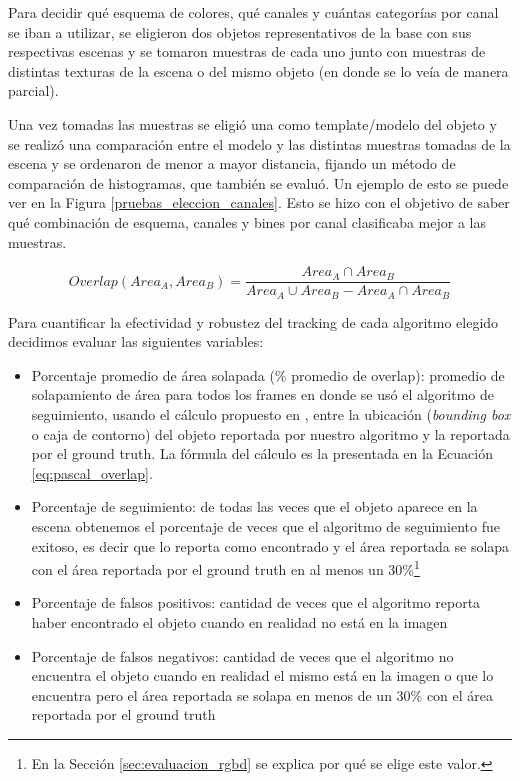 Para decidir qué esquema de colores, qué canales y cuántas categorías por canal se iban a utilizar, se eligieron dos objetos representativos de la base con sus respectivas escenas y se tomaron muestras de cada uno junto con muestras de distintas texturas de la escena o del mismo objeto (en donde se lo veía de manera parcial).

Una vez tomadas las muestras se eligió una como template/modelo del objeto y se realizó una comparación entre el modelo y las distintas muestras tomadas de la escena y se ordenaron de menor a mayor distancia, fijando un método de comparación de histogramas, que también se evaluó. Un ejemplo de esto se puede ver en la Figura \ref{pruebas_eleccion_canales}. Esto se hizo con el objetivo de saber qué combinación de esquema, canales y bines por canal clasificaba mejor a las muestras.

\begin{equation}\label{eq:pascal_overlap}
Overlap(Area_A, Area_B) = \frac{Area_A \cap Area_B}{Area_A \cup Area_B - Area_A \cap Area_B}
\end{equation}


Para cuantificar la efectividad y robustez del tracking de cada algoritmo elegido decidimos evaluar las siguientes variables:
\begin{itemize}
	\item Porcentaje promedio de área solapada (\% promedio de overlap): promedio de solapamiento de área para todos los frames en donde se usó el algoritmo de seguimiento, usando el cálculo propuesto en \cite{everinghampascal}, entre la ubicación (\textit{bounding box} o caja de contorno) del objeto reportada por nuestro algoritmo y la reportada por el ground truth. La fórmula del cálculo es la presentada en la Ecuación \ref{eq:pascal_overlap}.
	\item Porcentaje de seguimiento: de todas las veces que el objeto aparece en la escena obtenemos el porcentaje de veces que el algoritmo de seguimiento fue exitoso, es decir que lo reporta como encontrado y el área reportada se solapa con el área reportada por el ground truth en al menos un 30\%\footnote{En la Sección \ref{sec:evaluacion_rgbd} se explica por qué se elige este valor.}
	\item Porcentaje de falsos positivos: cantidad de veces que el algoritmo reporta haber encontrado el objeto cuando en realidad no está en la imagen
	\item Porcentaje de falsos negativos: cantidad de veces que el algoritmo no encuentra el objeto cuando en realidad el mismo está en la imagen o que lo encuentra pero el área reportada se solapa en menos de un 30\% con el área reportada por el ground truth
\end{itemize}

